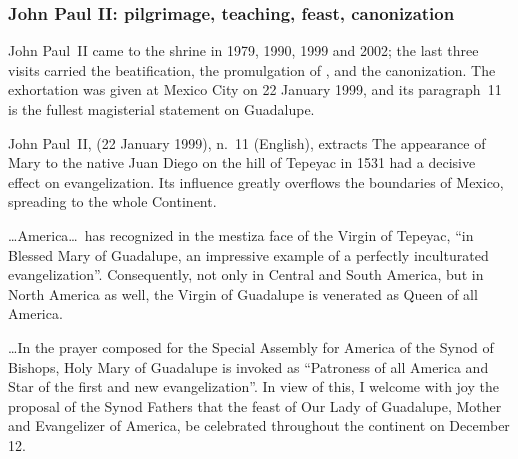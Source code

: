 \subsubsection*{John Paul II: pilgrimage, teaching, feast,
canonization}

John Paul~II came to the shrine in 1979, 1990, 1999 and 2002; the last
three visits carried the beatification, the promulgation of
, and the canonization. The exhortation was
given at Mexico City on 22 January 1999, and its paragraph~11 is the
fullest magisterial statement on Guadalupe.

\begin{operativetext}{John Paul~II,  (22
January 1999), n.~11 (English), extracts}
The appearance of Mary to the native Juan Diego on the hill of
Tepeyac in 1531 had a decisive effect on evangelization. Its
influence greatly overflows the boundaries of Mexico, spreading to
the whole Continent.\par
\ldots America\ldots\ has recognized in the mestiza face of the Virgin
of Tepeyac, ``in Blessed Mary of Guadalupe, an impressive example of a
perfectly inculturated evangelization''. Consequently, not only in
Central and South America, but in North America as well, the Virgin
of Guadalupe is venerated as Queen of all America.\par
\ldots In the prayer composed for the Special Assembly for America of
the Synod of Bishops, Holy Mary of Guadalupe is invoked as
``Patroness of all America and Star of the first and new
evangelization''. In view of this, I welcome with joy the proposal of
the Synod Fathers that the feast of Our Lady of Guadalupe, Mother and
Evangelizer of America, be celebrated throughout the continent on
December 12.
\end{operativetext}

